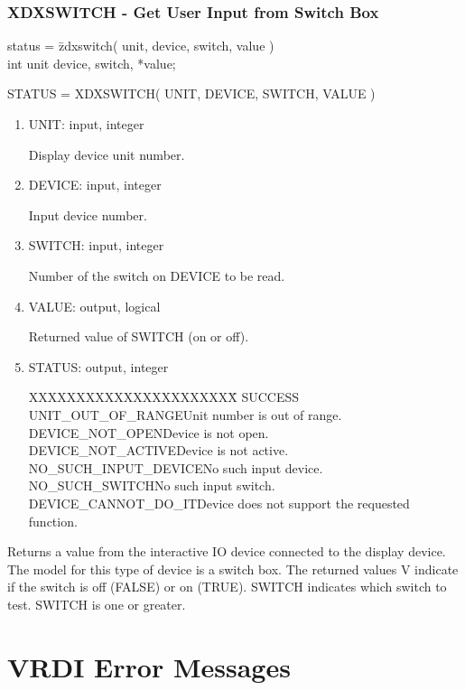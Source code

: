 \subsubsection{XDXSWITCH - Get User Input from Switch Box}
\begin{tabbing}
status = \=zdxswitch( unit, device, switch, value )\\
\>int  unit device, switch, *value;\\
\end{tabbing}
STATUS = XDXSWITCH( UNIT, DEVICE, SWITCH, VALUE )
\begin{enumerate}
\item UNIT:  input, integer

Display device unit number.
\item DEVICE:  input, integer

Input device number.
\item SWITCH:  input, integer

Number of the switch on DEVICE to be read.
\item VALUE:  output, logical

Returned value of SWITCH (on or off).
\item STATUS:  output, integer
\begin{tabbing}
XXXXXXXXXXXXXXXXXXXXXX\=\kill
SUCCESS\\
UNIT\_OUT\_OF\_RANGE\>Unit number is out of range.\\
DEVICE\_NOT\_OPEN\>Device is not open.\\
DEVICE\_NOT\_ACTIVE\>Device is not active.\\
NO\_SUCH\_INPUT\_DEVICE\>No such input device.\\
NO\_SUCH\_SWITCH\>No such input switch.\\
DEVICE\_CANNOT\_DO\_IT\>Device does not support the requested function.\\
\end{tabbing}
\end{enumerate}
Returns a value from the interactive IO device connected to the
display device.  The model for this type of device is a switch box.
The returned values V indicate if the switch is off (FALSE) or on
(TRUE).  SWITCH indicates which switch to test.  SWITCH is one or
greater.
\cleardoublepage
\appendix
\section{VRDI Error Messages}

